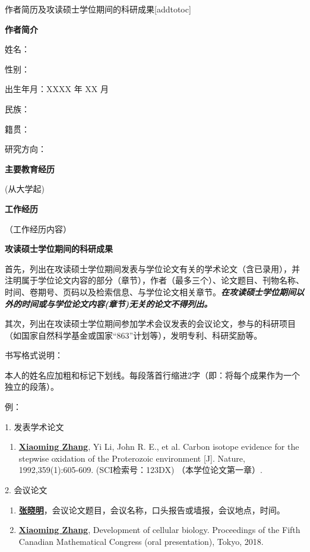 
\begin{personalcv}{作者简历及攻读硕士学位期间的科研成果}[addtotoc]

{\bf 作者简介}

姓名：

性别：

出生年月：XXXX 年 XX 月

民族：

籍贯：

研究方向：

{\bf 主要教育经历}

(从大学起)

{\bf 工作经历}

（工作经历内容）

{\bf 攻读硕士学位期间的科研成果}

首先，列出在攻读硕士学位期间发表与学位论文有关的学术论文（含已录用），并注明属于学位论文内容的部分（章节），作者（最多三个）、论文题目、刊物名称、时间、卷期号、页码以及检索信息、与学位论文相关章节。{\bf\itshape 在攻读硕士学位期间以外的时间或与学位论文内容(章节)无关的论文不得列出。}

其次，列出在攻读硕士学位期间参加学术会议发表的会议论文，参与的科研项目（如国家自然科学基金或国家“863”计划等），发明专利、科研奖励等。

书写格式说明：

本人的姓名应加粗和标记下划线。每段落首行缩进2字（即：将每个成果作为一个独立的段落）。

例：

1. 发表学术论文
\begin{enumerate}[nosep, label=$\lbrack$\arabic*$\rbrack$]
  \item{\underline{\bf Xiaoming Zhang}, Yi Li, John R. E., et al. Carbon isotope evidence for the stepwise oxidation of the Proterozoic environment [J]. Nature, 1992,359(1):605-609. (SCI检索号：123DX) （本学位论文第一章）.}
\end{enumerate}{}\vspace{1em}

2. 会议论文
\begin{enumerate}[nosep, label=$\lbrack$\arabic*$\rbrack$]
  \item{\underline{\bf 张晓明}，会议论文题目，会议名称，口头报告或墙报，会议地点，时间。}
  \item{\underline{\bf Xiaoming Zhang}, Development of cellular biology. Proceedings of the Fifth Canadian Mathematical Congress (oral presentation), Tokyo, 2018.}
\end{enumerate}{}\vspace{1em}


\end{personalcv}
